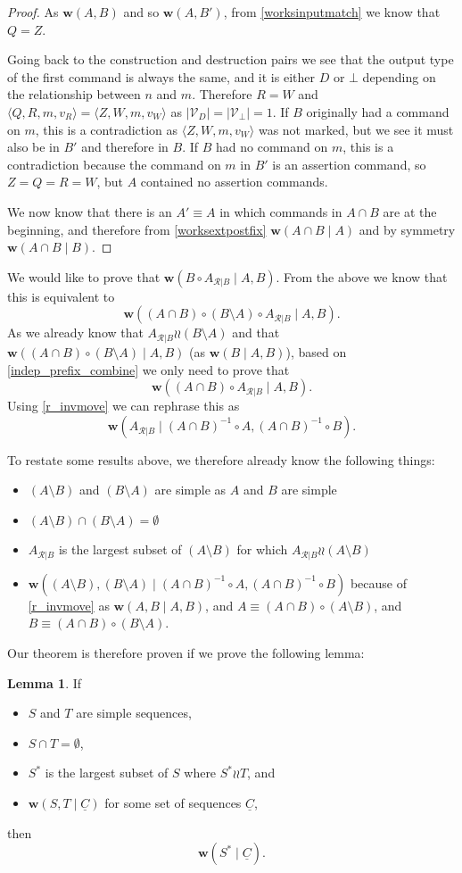 \documentclass[12pt]{article}
\newcommand{\setvx}[1]{\mathcal{V}_{#1}} %
\newcommand{\setd}{\setvx{D}} %
\newcommand{\setb}{\setvx{\empt}} %
\newcommand{\empt}{\bot}
\newcommand{\valvw}{v_W}
\newcommand{\valvr}{v_R}
\newcommand{\caaaa}[4]{\langle{#1,#2,#3,#4}\rangle}
\newcommand{\czwmv}{\caaaa{Z}{W}{m}{\valvw}}
\newcommand{\cqrmv}{\caaaa{Q}{R}{m}{\valvr}}
\newcommand{\cc}{\circ} %
\newcommand{\indep}{\mathrel{\wr\wr}} %
\newcommand{\workssign}{\mathbf{w}}
\newcommand{\works}[1]{\workssign({#1})}
\newcommand{\worksc}[2]{\workssign({#1}\mathrel{|}{#2})}
\newcommand{\seqset}[1]{\underline{#1}} %
\newcommand{\recchar}[3]{{#1}^{#3}_{\mathcal{R}|{#2}}}
\newcommand{\reca}{\recchar{A}{B}{}} %
\newcommand{\acb}{(A\cap B)}
\newcommand{\acbi}{\acb^{-1}}
\newcommand{\amb}{(A\setminus B)}
\newcommand{\bma}{(B\setminus A)}
\theoremstyle{definition}
\newtheorem{mylem}{Lemma}
\begin{document}
\begin{proof}
As $\works{A,B}$ and so $\works{A,B'}$, 
from \cref{worksinputmatch}
we know that $Q=Z$. 

Going back to the construction and destruction pairs we see that the output type of the first command
is always the same, and it is either $D$ or $\empt$ depending on the relationship between $n$ and $m$.
Therefore $R=W$ and $\cqrmv=\czwmv$
as $|\setd|=|\setb|=1$. 
If $B$ originally had a command on $m$,
this is a contradiction as $\czwmv$ was not marked, but we see it must also be in $B'$ and therefore in $B$.
If $B$ had no command on $m$,
this is a contradiction because the command on $m$ in $B'$ is an assertion command, so $Z=Q=R=W$, 
but $A$ contained no assertion commands.

\medskip

We now know that there is an $A'\equiv A$ in which commands in $A\cap B$
are at the beginning, and therefore 
from \cref{worksextpostfix}
$\worksc{A\cap B}{A}$ and by symmetry $\worksc{A\cap B}{B}$.
\end{proof}

\medskip


We would like to prove that $\worksc{B\cc \reca}{A,B}$.
From the above we know that this is equivalent to
\[ \worksc{\acb\cc \bma\cc \reca}{A,B}. \]
As we already know that $\reca\indep\bma$
and that $\worksc{\acb\cc \bma}{A,B}$
(as $\worksc{B}{A,B}$),
based on \cref{indep_prefix_combine}
we only need to prove that
\[ \worksc{\acb\cc \reca}{A,B}. \]
Using \cref{r_invmove} we can rephrase this as
\[ \worksc{\reca}{\acbi\cc A,\acbi\cc B}. \]

To restate some results above, we therefore already know the following things:
\begin{itemize}
\item $\amb$ and $\bma$ are simple as $A$ and $B$ are simple
\item $\amb \cap \bma = \emptyset$
\item $\reca$ is the largest subset of $\amb$ for which $\reca\indep\amb$
\item $\worksc{\amb, \bma}{\acbi\cc A,\acbi\cc B}$ 
because of \cref{r_invmove}
as $\worksc{A,B}{A,B}$,
and $A\equiv\acb\cc\amb$, and $B\equiv\acb\cc\bma$.
\end{itemize}

Our theorem is therefore proven if we prove the following lemma:
\newcommand{\condSimple}{(c1)}
\newcommand{\condDisj}{(c2)}
\newcommand{\condApr}{(c3)}
\newcommand{\condWork}{(c4)}
\begin{mylem}
If
   \begin{itemize}
   \item[\condSimple] $S$ and $T$ are simple sequences,
   \item[\condDisj] $S\cap T=\emptyset$,
   \item[\condApr] $S^*$ is the largest subset of $S$ where $S^*\indep T$, and
   \item[\condWork] $\worksc{S,T}{\seqset{C}}$ for some set of sequences $\seqset{C}$,
   \end{itemize}
then
\[ \worksc{S^*}{\seqset{C}}. \]
\end{mylem}
\end{document}
